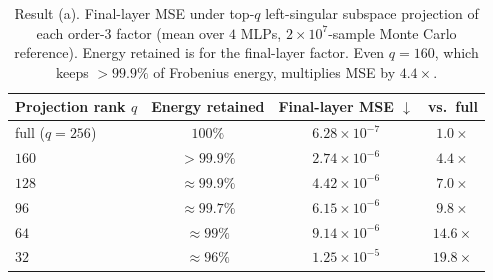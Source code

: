 \documentclass[11pt]{article}
\theoremstyle{remark}
\begin{document}
\begin{table}[t]
\centering
\caption{Result (a). Final-layer MSE under top-$q$ left-singular subspace
projection of each order-3 factor (mean over $4$ MLPs, $2\times10^7$-sample
Monte Carlo reference). Energy retained is for the final-layer factor. Even
$q=160$, which keeps $>99.9\%$ of Frobenius energy, multiplies MSE by
$4.4\times$.}
\label{tab:proj}
\small
\begin{tabular}{lccc}
\toprule
Projection rank $q$ & Energy retained & Final-layer MSE $\downarrow$ & vs.\ full \\
\midrule
full ($q=256$) & $100\%$    & $6.28\times10^{-7}$ & $1.0\times$ \\
$160$          & $>99.9\%$  & $2.74\times10^{-6}$ & $4.4\times$ \\
$128$          & $\approx99.9\%$ & $4.42\times10^{-6}$ & $7.0\times$ \\
$96$           & $\approx99.7\%$ & $6.15\times10^{-6}$ & $9.8\times$ \\
$64$           & $\approx99\%$   & $9.14\times10^{-6}$ & $14.6\times$ \\
$32$           & $\approx96\%$   & $1.25\times10^{-5}$ & $19.8\times$ \\
\bottomrule
\end{tabular}
\end{table}
\end{document}
